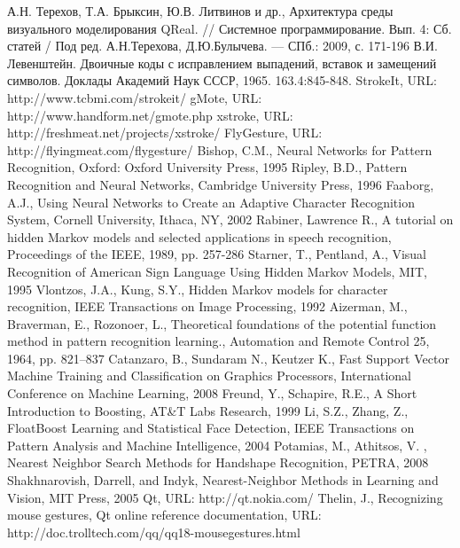 \documentclass[a5paper]{article}
\begin{document}
\begin{thebibliography}{9000}
   А.Н. Терехов, Т.А. Брыксин, Ю.В. Литвинов и др., Архитектура среды визуального моделирования QReal. // Системное 
программирование. Вып. 4: Сб. статей / Под ред. А.Н.Терехова, Д.Ю.Булычева. --- СПб.: 2009, с. 171-196
   В.И. Левенштейн. Двоичные коды с исправлением выпадений, вставок и замещений символов. Доклады Академий Наук СССР, 1965. 163.4:845-848.
   StrokeIt, URL: http://www.tcbmi.com/strokeit/  
   gMote, URL: http://www.handform.net/gmote.php
   xstroke, URL: http://freshmeat.net/projects/xstroke/
   FlyGesture, URL: http://flyingmeat.com/flygesture/
   Bishop, C.M., Neural Networks for Pattern Recognition, Oxford: Oxford University Press, 1995
   Ripley, B.D., Pattern Recognition and Neural Networks, Cambridge University Press, 1996
   Faaborg, A.J., Using Neural Networks to Create an Adaptive Character Recognition System, Cornell University, Ithaca, NY, 2002
   Rabiner, Lawrence R., A tutorial on hidden Markov models and selected applications in speech recognition, Proceedings of the IEEE, 1989, pp. 257-286
   Starner, T., Pentland, A., Visual Recognition of American Sign Language Using Hidden Markov Models, MIT, 1995
   Vlontzos, J.A., Kung, S.Y., Hidden Markov models for character recognition, IEEE Transactions on Image Processing, 1992
   Aizerman, M., Braverman, E., Rozonoer, L., Theoretical foundations of the potential function method in pattern recognition learning., 
Automation and Remote Control 25, 1964, pp. 821–837
   Catanzaro, B., Sundaram N., Keutzer K., Fast Support Vector Machine Training and Classification on Graphics Processors, International 
Conference on Machine Learning, 2008
   Freund, Y., Schapire, R.E., A Short Introduction to Boosting, AT\&T Labs Research, 1999
   Li, S.Z., Zhang, Z., FloatBoost Learning and Statistical Face Detection, IEEE Transactions on Pattern Analysis and Machine Intelligence, 2004
   Potamias, M., Athitsos, V. , Nearest Neighbor Search Methods for Handshape Recognition, PETRA, 2008
   Shakhnarovish, Darrell, and Indyk, Nearest-Neighbor Methods in Learning and Vision, MIT Press, 2005
   Qt, URL: http://qt.nokia.com/
   Thelin, J., Recognizing mouse gestures, Qt online reference documentation, URL: http://doc.trolltech.com/qq/qq18-mousegestures.html 
\end{thebibliography}
  
\end{document}
